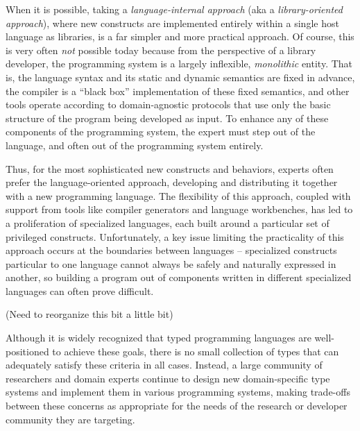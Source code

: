 When it is possible, taking a \emph{language-internal approach} (aka a \emph{library-oriented approach}), where new constructs are implemented entirely within a single host language as libraries, is a far simpler and more practical approach. %
Of course, this is very often \emph{not} possible today because from the perspective of a library developer, the programming system is a largely inflexible, \emph{monolithic} entity. That is, the language syntax and its static and dynamic semantics are fixed in advance, the compiler is a ``black box'' implementation of these fixed semantics, and other tools operate according to domain-agnostic protocols that use only the basic structure of the program being developed as input. To enhance any of these components of the programming system, the expert must step out of the language, and often out of the programming system entirely. 

Thus, for the most sophisticated new constructs and behaviors, experts often prefer the  {language-oriented approach}, developing and distributing it together with a new programming language. The flexibility of this approach, coupled with support from tools like compiler generators and language workbenches, has led to a proliferation of specialized languages, each built around a particular set of privileged constructs. Unfortunately, a key issue limiting the practicality of this approach occurs at the boundaries between languages -- specialized constructs particular to one language cannot always be safely and naturally expressed in another, so building a program out of components written in different specialized languages can often prove difficult. 

{\color{red} (Need to reorganize this bit a little bit)} 

Although it is widely recognized that typed programming languages are well-positioned to achieve these goals, there is no small collection of types that can adequately satisfy these criteria in all cases. Instead, a large community of researchers and domain experts continue to design new domain-specific type systems and implement them in various programming systems, making trade-offs between these concerns as appropriate for the needs of the research or developer community they are targeting.


